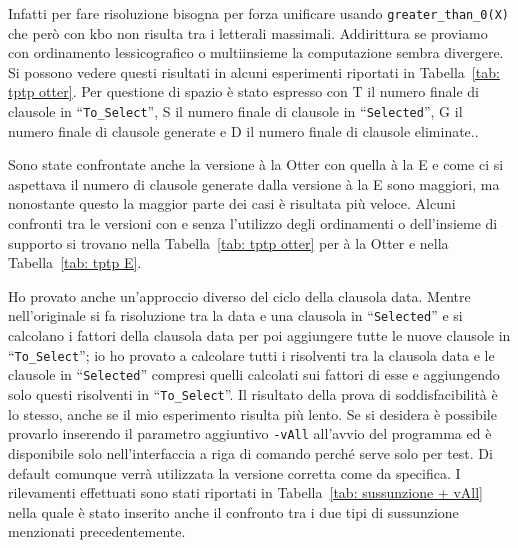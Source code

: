 \documentclass[a4paper,11pt]{article} %
\newcommand{\sintassi}{\texttt}
\newcommand{\campo}{\texttt}
\newcommand{\cod}{\lstset{basicstyle=\ttfamily}\lstinline}
\begin{document}
%
Infatti per fare risoluzione bisogna per forza %
unificare %
usando
\cod{greater_than_0(X)} %
che però con kbo non risulta tra i letterali massimali.
Addirittura se proviamo con ordinamento lessicografico o multiinsieme 
la computazione sembra divergere.
Si possono vedere questi risultati in alcuni esperimenti riportati
in Tabella~\ref{tab: tptp otter}. Per questione di spazio
è stato espresso con \textsf{T} il numero finale di clausole in 
``\campo{To\_Select}'',
\textsf{S} il numero finale di clausole in ``\campo{Selected}'',
\textsf{G} il numero finale di clausole generate e
\textsf{D} il numero finale di clausole eliminate..

Sono state confrontate anche la versione à la Otter con quella à la E e
come ci si aspettava il numero di clausole generate dalla versione à la E
sono maggiori, ma nonostante questo la maggior parte dei casi
è risultata più veloce.
Alcuni confronti tra le versioni con e senza l'utilizzo degli ordinamenti
o dell'insieme di supporto
si trovano nella Tabella~\ref{tab: tptp otter} per à la Otter
e nella Tabella~\ref{tab: tptp E}.

Ho provato anche un'approccio diverso del ciclo della clausola data.
Mentre nell'originale si fa risoluzione tra la
data e una clausola in ``\campo{Selected}'' 
e si calcolano i fattori della clausola data
per poi aggiungere tutte le nuove clausole
in ``\campo{To\_Select}''; io ho provato a calcolare tutti i risolventi tra
la clausola data e le clausole in ``\campo{Selected}'' compresi quelli calcolati 
sui fattori di esse e aggiungendo solo questi risolventi in ``\campo{To\_Select}''.
Il risultato della prova di soddisfacibilità è lo stesso, anche se il mio esperimento
risulta più lento. Se si desidera è possibile provarlo inserendo
il parametro aggiuntivo \sintassi{-vAll} all'avvio del programma ed è 
disponibile solo nell'interfaccia a riga di comando perché serve solo per test.
Di default comunque verrà utilizzata la versione corretta come da specifica.
I rilevamenti effettuati sono stati riportati in Tabella~\ref{tab: sussunzione + vAll}
nella quale è stato inserito anche il confronto tra i due tipi di sussunzione
menzionati precedentemente.
\end{document}
